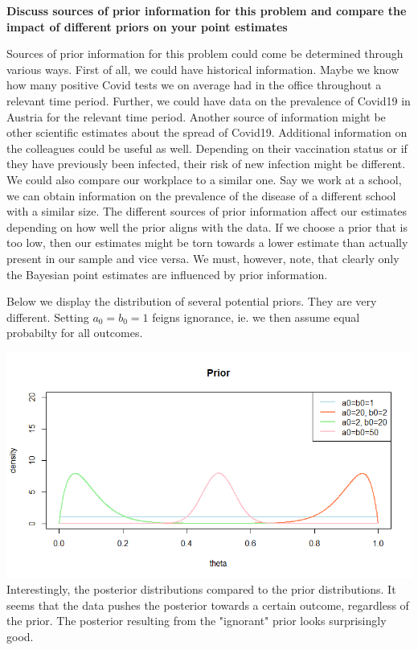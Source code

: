 \documentclass{article}
\begin{document}
\begin{center}
    \textbf{Discuss sources of prior information for this problem and compare the impact of different priors on your point estimates}
\end{center}

\vspace{2em}

Sources of prior information for this problem could come be determined through various ways. First of all, we could have historical information. Maybe we know how many positive Covid tests we on average had in the office throughout a relevant time period.
Further, we could have data on the prevalence of Covid19 in Austria for the relevant time period.
Another source of information might be other scientific estimates about the spread of Covid19.
Additional information on the colleagues could be useful as well. Depending on their vaccination status or if they have previously been infected, their risk of new infection might be different. We could also compare our workplace to a similar one. Say we work at a school, we can obtain information on the prevalence of the disease of a different school with a similar size.
The different sources of prior information affect our estimates depending on how well the prior aligns with the data. If we choose a prior that is too low, then our estimates might be torn towards a lower estimate than actually present in our sample and vice versa. We must, however, note, that clearly only the Bayesian point estimates are influenced by prior information. \par

Below we display the distribution of several potential priors. They are very different. Setting $a_0=b_0=1$ feigns ignorance, ie. we then assume equal probabilty for all outcomes.

\includegraphics{Figures and Plots/figure-latex/Rplot 2 prior.png}
\newpage
Interestingly, the posterior distributions compared to the prior distributions. It seems that the data pushes the posterior towards a certain outcome, regardless of the prior. The posterior resulting from the "ignorant" prior looks surprisingly good. 
\end{document}
